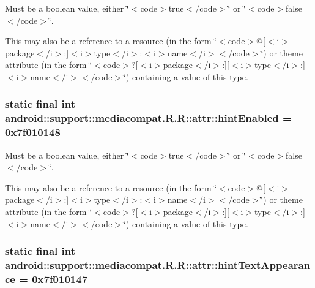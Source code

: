 Must be a boolean value, either \char`\"{}$<$code$>$true$<$/code$>$\char`\"{} or \char`\"{}$<$code$>$false$<$/code$>$\char`\"{}. 

This may also be a reference to a resource (in the form \char`\"{}$<$code$>$@\mbox{[}$<$i$>$package$<$/i$>$:\mbox{]}$<$i$>$type$<$/i$>$:$<$i$>$name$<$/i$>$$<$/code$>$\char`\"{}) or theme attribute (in the form \char`\"{}$<$code$>$?\mbox{[}$<$i$>$package$<$/i$>$:\mbox{]}\mbox{[}$<$i$>$type$<$/i$>$:\mbox{]}$<$i$>$name$<$/i$>$$<$/code$>$\char`\"{}) containing a value of this type. \hypertarget{classandroid_1_1support_1_1mediacompat_1_1_r_1_1attr_8236087cbb74b93b071412349d627c7f}{
\subsubsection[{hintEnabled}]{\setlength{\rightskip}{0pt plus 5cm}static final int android::support::mediacompat.R.R::attr::hintEnabled = 0x7f010148}}
\label{classandroid_1_1support_1_1mediacompat_1_1_r_1_1attr_8236087cbb74b93b071412349d627c7f}


Must be a boolean value, either \char`\"{}$<$code$>$true$<$/code$>$\char`\"{} or \char`\"{}$<$code$>$false$<$/code$>$\char`\"{}. 

This may also be a reference to a resource (in the form \char`\"{}$<$code$>$@\mbox{[}$<$i$>$package$<$/i$>$:\mbox{]}$<$i$>$type$<$/i$>$:$<$i$>$name$<$/i$>$$<$/code$>$\char`\"{}) or theme attribute (in the form \char`\"{}$<$code$>$?\mbox{[}$<$i$>$package$<$/i$>$:\mbox{]}\mbox{[}$<$i$>$type$<$/i$>$:\mbox{]}$<$i$>$name$<$/i$>$$<$/code$>$\char`\"{}) containing a value of this type. \hypertarget{classandroid_1_1support_1_1mediacompat_1_1_r_1_1attr_2ba2deefc86f49c16c1a6ebf4c4e96cf}{
\subsubsection[{hintTextAppearance}]{\setlength{\rightskip}{0pt plus 5cm}static final int android::support::mediacompat.R.R::attr::hintTextAppearance = 0x7f010147}}
\label{classandroid_1_1support_1_1mediacompat_1_1_r_1_1attr_2ba2deefc86f49c16c1a6ebf4c4e96cf}


